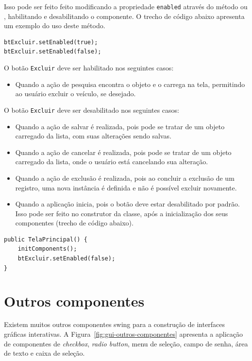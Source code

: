 Isso pode ser feito feito modificando a propriedade \texttt{enabled} através do método  ou , habilitando e desabilitando o componente. O trecho de código abaixo apresenta um exemplo do uso deste método.

\begin{verbatim}
btExcluir.setEnabled(true);
btExcluir.setEnabled(false);
\end{verbatim}

O botão \texttt{Excluir} deve ser habilitado nos seguintes casos:

\begin{itemize}
	\item Quando a ação de pesquisa encontra o objeto e o carrega na tela, permitindo ao usuário excluir o veículo, se desejado.
\end{itemize}

O botão \texttt{Excluir} deve ser desabilitado nos seguintes casos:

\begin{itemize}
	\item Quando a ação de salvar é realizada, pois pode se tratar de um objeto carregado da lista, com suas alterações sendo salvas.
	\item Quando a ação de cancelar é realizada, pois pode se tratar de um objeto carregado da lista, onde o usuário está cancelando sua alteração.
	\item Quando a ação de exclusão é realizada, pois ao concluir a exclusão de um registro, uma nova instância é definida e não é possível excluir novamente.
	\item Quando a aplicação inicia, pois o botão deve estar desabilitado por padrão. Isso pode ser feito no construtor da classe, após a inicialização dos seus componentes (trecho de código abaixo).
\end{itemize}

\begin{verbatim}
public TelaPrincipal() {
	initComponents();
	btExcluir.setEnabled(false);
}
\end{verbatim}

\section{Outros componentes}

Existem muitos outros componentes swing para a construção de interfaces gráficas interativas. A Figura~\ref{fig:gui-outros-componentes} apresenta a aplicação de componentes de \textit{checkbox}, \textit{radio button}, menu de seleção, campo de senha, área de texto e caixa de seleção.

